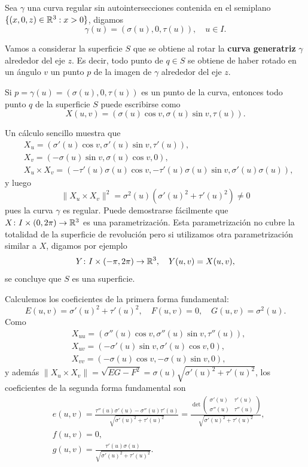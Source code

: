 \begin{example}
	\label{exa:revolucion}
	Sea $\gamma$ una curva regular sin autointersecciones contenida en el semiplano
	$\{(x,0,z)\in\mathbb{R}^3:x>0\}$, digamos
	\[
	\gamma(u)=(\sigma(u),0,\tau(u)),\quad u\in I.
	\]

	Vamos a considerar la superficie $S$ que se obtiene al rotar la
	\textbf{curva generatriz} $\gamma$ alrededor del eje $z$. Es decir, todo
	punto de $q\in S$ se obtiene de haber rotado en un ángulo $v$ un punto $p$
	de la imagen de $\gamma$ alrededor del eje $z$.

	Si $p=\gamma(u)=(\sigma(u),0,\tau(u))$ es un punto de la curva, entonces
	todo punto $q$ de la superficie $S$ puede escribirse como
	\[
		X(u,v)=(\sigma(u)\cos v,\sigma(u)\sin v,\tau(u)).
	\]

	Un cálculo sencillo muestra que
	\begin{align*}
		&X_u=(\sigma'(u)\cos v,\sigma'(u)\sin v,\tau'(u)),\\
		&X_v=(-\sigma(u)\sin v,\sigma(u)\cos v,0),\\
		&X_u\times X_v=(-\tau'(u)\sigma(u)\cos v,-\tau'(u)\sigma(u)\sin v,\sigma'(u)\sigma(u)),
	\end{align*}
	y luego 
	\[
		\|X_u\times X_v\|^2=\sigma^2(u)(\sigma'(u)^2+\tau'(u)^2)\ne 0
	\]
	 pues la curva $\gamma$ 
	es regular.
	Puede demostrarse fácilmente que $X\colon I\times(0,2\pi)\to\mathbb{R}^3$ es una
	parametrización. Esta parametrización no cubre la totalidad de la
	superficie de revolución pero si utilizamos otra parametrización similar a
	$X$, digamos por ejemplo
	\[
		Y\colon I\times(-\pi,2\pi)\to\mathbb{R}^3,\quad
		Y(u,v)=X(u,v),
	\]
	se concluye que $S$ es una superficie. 

	Calculemos los coeficientes de la primera forma fundamental:
	\[
		E(u,v)=\sigma'(u)^2+\tau'(u)^2,\quad
		F(u,v)=0,\quad
		G(u,v)=\sigma^2(u).
	\]
	Como 
	\begin{align*}
		&X_{uu}=(\sigma''(u)\cos v,\sigma''(u)\sin v,\tau''(u)),\\
		&X_{uv}=(-\sigma'(u)\sin v,\sigma'(u)\cos v,0),\\
		&X_{vv}=(-\sigma(u)\cos v,-\sigma(u)\sin v,0),
	\end{align*}
	y además $\|X_u\times X_v\|=\sqrt{EG-F^2}=\sigma(u)\sqrt{\sigma'(u)^2+\tau'(u)^2}$, los coeficientes de
	la segunda forma fundamental son
	\begin{align*}
		&e(u,v)=\frac{\tau''(u)\sigma'(u)-\sigma''(u)\tau'(u)}{\sqrt{\sigma'(u)^2+\tau'(u)^2}}=\frac{\det\begin{pmatrix}\sigma'(u) & \tau'(u)\\\sigma''(u)&\tau''(u)\end{pmatrix}}{\sqrt{\sigma'(u)^2+\tau'(u)^2}},\\
		&f(u,v)=0,\\
		&g(u,v)=\frac{\tau'(u)\sigma(u)}{\sqrt{\sigma'(u)^2+\tau'(u)^2}}.
	\end{align*}


\end{example}
